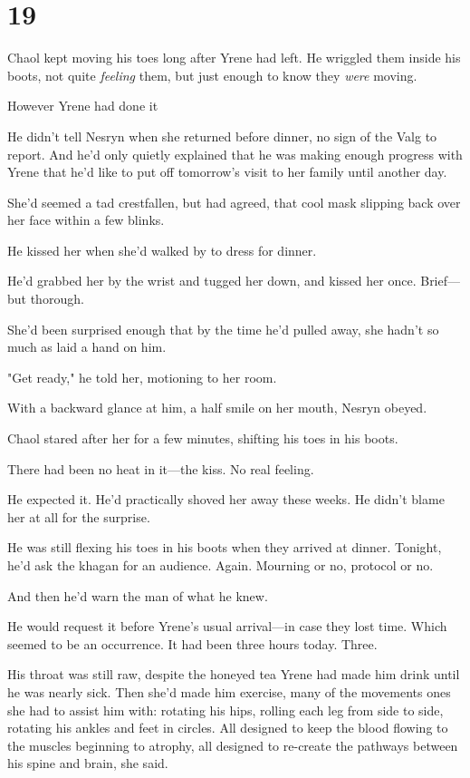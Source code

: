 
\chapter{19}

Chaol kept moving his toes long after Yrene had left.
He wriggled them inside his boots, not quite \emph{feeling} them, but just enough to know they \emph{were} moving.

However Yrene had done it 

He didn't tell Nesryn when she returned before dinner, no sign of the Valg to report.
And he'd only quietly explained that he was making enough progress with Yrene that he'd like to put off tomorrow's visit to her family until another day.

She'd seemed a tad crestfallen, but had agreed, that cool mask slipping back over her face within a few blinks.

He kissed her when she'd walked by to dress for dinner.

He'd grabbed her by the wrist and tugged her down, and kissed her once.
Brief---but thorough.

She'd been surprised enough that by the time he'd pulled away, she hadn't so much as laid a hand on him.

"Get ready," he told her, motioning to her room.

With a backward glance at him, a half smile on her mouth, Nesryn obeyed.

Chaol stared after her for a few minutes, shifting his toes in his boots.

There had been no heat in it---the kiss.
No real feeling.

He expected it.
He'd practically shoved her away these weeks.
He didn't blame her at all for the surprise.

He was still flexing his toes in his boots when they arrived at dinner.
Tonight, he'd ask the khagan for an audience.
Again.
Mourning or no, protocol or no.

And then he'd warn the man of what he knew.

He would request it before Yrene's usual arrival---in case they lost time.
Which seemed to be an occurrence.
It had been three hours today.
Three.

His throat was still raw, despite the honeyed tea Yrene had made him drink until he was nearly sick.
Then she'd made him exercise, many of the movements ones she had to assist him with: rotating his hips, rolling each leg from side to side, rotating his ankles and feet in circles.
All designed to keep the blood flowing to the muscles beginning to atrophy, all designed to re-create the pathways between his spine and brain, she said.

